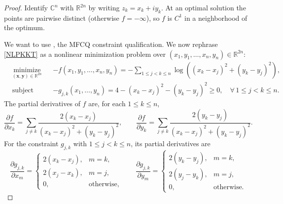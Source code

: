 \documentclass{article}
\theoremstyle{definition}
\newcommand{\C}{\mathbb{C}}
\newcommand{\R}{\mathbb{R}}
\let\le\leqslant
\let\geq\geqslant
\begin{document}
\begin{proof}
Identify \(\C^n\) with \(\R^{2n}\) by writing \(z_k=x_k+iy_k\).
At an optimal solution the points are pairwise distinct (otherwise \(f=-\infty\)),
so \(f\) is \(C^1\) in a neighborhood of the optimum.

We want to use \cite[Theorem~12.1, Definition~12.6 and around]{nocedal2006numerical},
the MFCQ constraint qualification. We now rephrase \cref{NLPKKT} as a nonlinear
minimization problem over \((x_1,y_1,\dots,x_n,y_n)\in \mathbb{R}^{2n}\):
\begin{equation*}
\begin{aligned}
& \underset{(\mathbf{x},\mathbf{y}) \in \mathbb{R}^{2n}}{\text{minimize}}
& & -f(x_1,y_1,\dots,x_n,y_n)
=-\sum_{1 \le j < k \le n} \log \left( (x_k-x_j)^2+(y_k-y_j)^2 \right), \\
& \text{subject to}
& & -g_{j,k}(x_1,\dots,y_n)
=4- (x_k-x_j)^2-(y_k-y_j)^2 \geq 0,
\quad \forall \, 1 \le j < k \le n .
\end{aligned}
\end{equation*}
The partial derivatives of \(f\) are, for each \(1\le k\le n\),
\[
\frac{\partial f}{\partial x_k}
=\sum_{j\neq k}\frac{2(x_k-x_j)}{(x_k-x_j)^2+(y_k-y_j)^2},
\qquad
\frac{\partial f}{\partial y_k}
=\sum_{j\neq k}\frac{2(y_k-y_j)}{(x_k-x_j)^2+(y_k-y_j)^2}.
\]
For the constraint \(g_{j,k}\) with \(1\le j<k\le n\), its partial derivatives are
\[
\frac{\partial g_{j,k}}{\partial x_m}=
\begin{cases}
2(x_k-x_j), & m=k,\\
2(x_j-x_k), & m=j,\\
0, & \text{otherwise,}
\end{cases}
\qquad
\frac{\partial g_{j,k}}{\partial y_m}=
\begin{cases}
2(y_k-y_j), & m=k,\\
2(y_j-y_k), & m=j,\\
0, & \text{otherwise.}
\end{cases}
\]


\end{proof}
\end{document}
